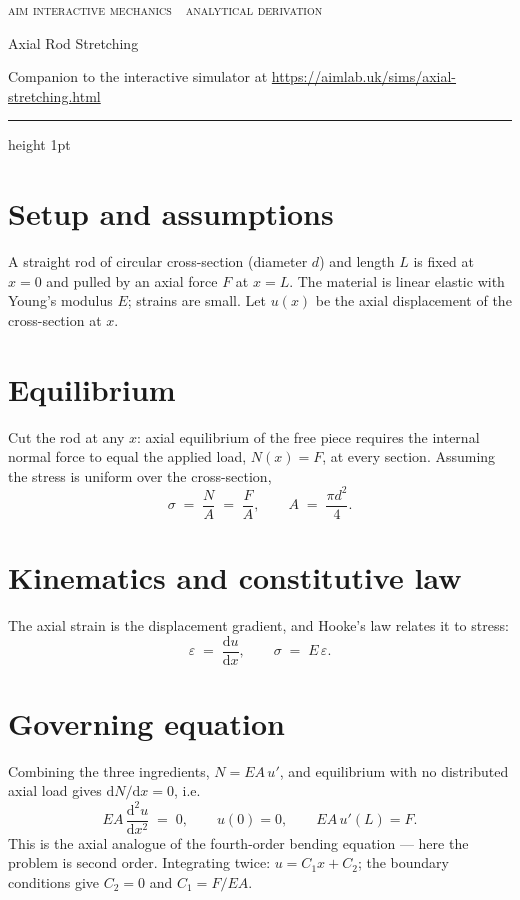 \documentclass[10pt,a4paper]{article}
\begin{document}
{\footnotesize\textcolor{celdark}{\textsc{aim interactive mechanics \,\textperiodcentered\, analytical derivation}}}

{\LARGE Axial Rod Stretching}

\textcolor{celdark}{\small Companion to the interactive simulator at
\url{https://aimlab.uk/sims/axial-stretching.html}}

\medskip
{\color{celline}\hrule height 1pt}

\section*{Setup and assumptions}
A straight rod of circular cross-section (diameter $d$) and length $L$ is fixed at
$x = 0$ and pulled by an axial force $F$ at $x = L$. The material is linear
elastic with Young's modulus $E$; strains are small. Let $u(x)$ be the axial
displacement of the cross-section at $x$.

\section*{Equilibrium}
Cut the rod at any $x$: axial equilibrium of the free piece requires the internal
normal force to equal the applied load, $N(x) = F$, at every section. Assuming the
stress is uniform over the cross-section,
\begin{equation}
\sigma \;=\; \frac{N}{A} \;=\; \frac{F}{A},
\qquad
A \;=\; \frac{\pi d^2}{4}.
\end{equation}

\section*{Kinematics and constitutive law}
The axial strain is the displacement gradient, and Hooke's law relates it to
stress:
\begin{equation}
\varepsilon \;=\; \frac{\mathrm{d}u}{\mathrm{d}x},
\qquad
\sigma \;=\; E\,\varepsilon .
\end{equation}

\section*{Governing equation}
Combining the three ingredients, $N = EA\,u'$, and equilibrium with no distributed
axial load gives $\mathrm{d}N/\mathrm{d}x = 0$, i.e.
\begin{equation}
EA \,\frac{\mathrm{d}^2 u}{\mathrm{d}x^2} \;=\; 0,
\qquad
u(0) = 0, \qquad EA\,u'(L) = F .
\end{equation}
This is the axial analogue of the fourth-order bending equation --- here the
problem is second order. Integrating twice: $u = C_1 x + C_2$; the boundary
conditions give $C_2 = 0$ and $C_1 = F/EA$.
\end{document}
